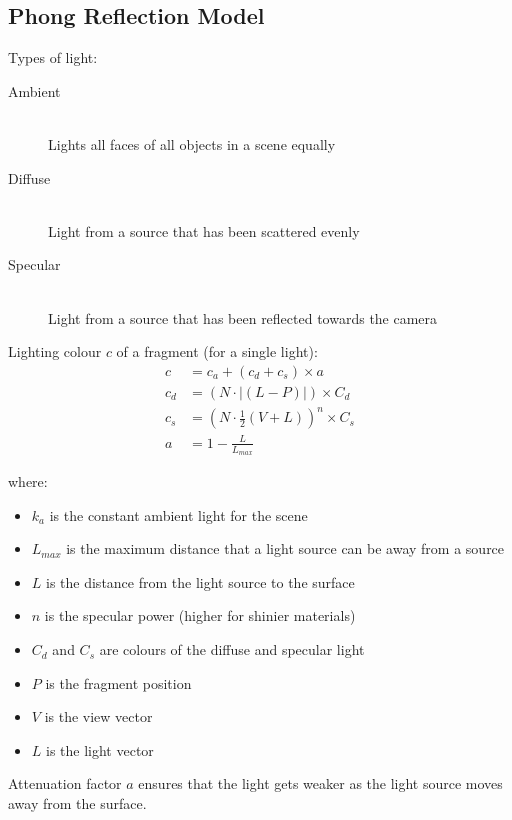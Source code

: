 \documentclass[a4paper]{article}
\begin{document}
\subsection{Phong Reflection Model}

Types of light:

\begin{description}
  \item[Ambient] \hfill \\
    Lights all faces of all objects in a scene equally
  \item[Diffuse] \hfill \\
    Light from a source that has been scattered evenly
  \item[Specular] \hfill \\
    Light from a source that has been reflected towards the camera
\end{description}

Lighting colour $c$ of a fragment (for a single light):
\begin{align*}
      c &= c_{a} + (c_{d} + c_{s}) \times a \\
  c_{d} &= (N \cdot |(L - P)|) \times C_{d} \\
  c_{s} &= (N \cdot \frac{1}{2}(V + L))^{n} \times C_{s}\\
      a &= 1 - \frac{L}{L_{max}}
\end{align*}

where:

\begin{itemize}
  \item $k_{a}$ is the constant ambient light for the scene
  \item $L_{max}$ is the maximum distance that a light source can be away from a
        source
  \item $L$ is the distance from the light source to the surface
  \item $n$ is the specular power (higher for shinier materials)
  \item $C_{d}$ and $C_{s}$ are colours of the diffuse and specular light
  \item $P$ is the fragment position
  \item $V$ is the view vector
  \item $L$ is the light vector
\end{itemize}

Attenuation factor $a$ ensures that the light gets weaker as the light source
moves away from the surface.
\end{document}

